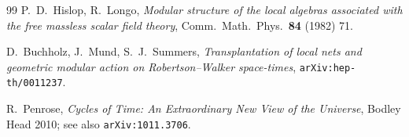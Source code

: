 \documentclass[11pt]{article}
\theoremstyle{definition}
\begin{document}
\begin{thebibliography}{99}
 P.~D.~Hislop, R.~Longo, \emph{Modular
structure of the local algebras associated with the free massless
scalar field theory}, Comm.\ Math.\ Phys.\ \textbf{84} (1982) 71.

 D.~Buchholz, J.~Mund, S.~J.~Summers,
\emph{Transplantation of local nets and geometric modular action on
Robertson--Walker space-times}, \texttt{arXiv:hep-th/0011237}.

 R.~Penrose, \emph{Cycles of Time: An
Extraordinary New View of the Universe}, Bodley Head 2010; see also
\texttt{arXiv:1011.3706}.
\end{thebibliography}
\end{document}
